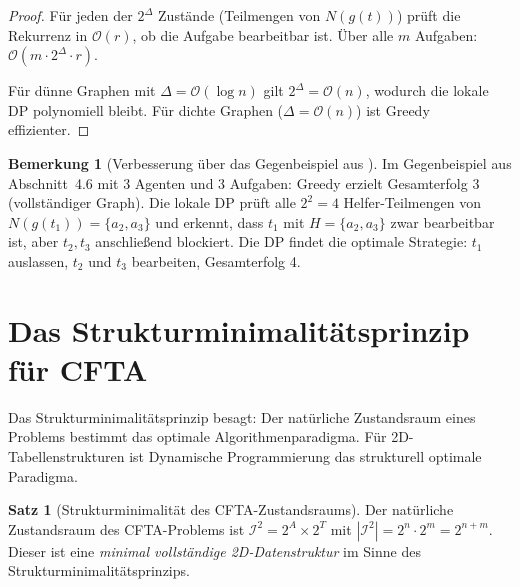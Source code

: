 \documentclass[a4paper,12pt]{article}
\theoremstyle{definition}
\newtheorem{satz}{Satz}
\newtheorem{bemerkung}{Bemerkung}
\begin{document}
\begin{proof}
    F\"{u}r jeden der $2^{\Delta}$ Zust\"{a}nde (Teilmengen von $N(g(t))$)
    pr\"{u}ft die Rekurrenz in $\mathcal{O}(r)$, ob die Aufgabe bearbeitbar ist.
    \"{U}ber alle $m$ Aufgaben: $\mathcal{O}(m \cdot 2^\Delta \cdot r)$.

    F\"{u}r d\"{u}nne Graphen mit $\Delta = \mathcal{O}(\log n)$ gilt
    $2^\Delta = \mathcal{O}(n)$, wodurch die lokale DP polynomiell bleibt.
    F\"{u}r dichte Graphen ($\Delta = \mathcal{O}(n)$) ist Greedy effizienter. \qedhere
\end{proof}

\begin{bemerkung}[Verbesserung \"{u}ber das Gegenbeispiel aus \cite{dwzk07}]
    Im Gegenbeispiel aus Abschnitt~4.6 mit 3 Agenten und 3 Aufgaben:
    Greedy erzielt Gesamterfolg 3 (vollst\"{a}ndiger Graph).
    Die lokale DP pr\"{u}ft alle $2^2 = 4$ Helfer-Teilmengen von
    $N(g(t_1)) = \{a_2, a_3\}$ und erkennt, dass $t_1$ mit
    $H = \{a_2, a_3\}$ zwar bearbeitbar ist, aber $t_2, t_3$ anschlie{\ss}end
    blockiert. Die DP findet die optimale Strategie: $t_1$ auslassen,
    $t_2$ und $t_3$ bearbeiten, Gesamterfolg 4.
\end{bemerkung}

\section{Das Strukturminimalit\"{a}tsprinzip f\"{u}r CFTA}

Das Strukturminimalit\"{a}tsprinzip \cite{epp2026struktur} besagt:
Der nat\"{u}rliche Zustandsraum eines Problems bestimmt das optimale
Algorithmenparadigma. F\"{u}r 2D-Tabellenstrukturen ist Dynamische
Programmierung das strukturell optimale Paradigma.

\begin{satz}[Strukturminimalit\"{a}t des CFTA-Zustandsraums]
    \label{satz:struct_cfta}
    Der nat\"{u}rliche Zustandsraum des CFTA-Problems ist
    $\mathcal{I}^2 = 2^A \times 2^T$ mit $|\mathcal{I}^2| = 2^n \cdot 2^m = 2^{n+m}$.
    Dieser ist eine \emph{minimal vollst\"{a}ndige 2D-Datenstruktur} im Sinne
    des Strukturminimalit\"{a}tsprinzips.
\end{satz}
\end{document}
